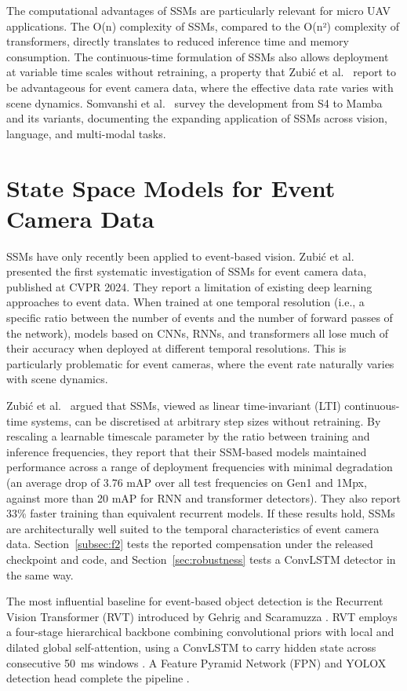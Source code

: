 \documentclass[11pt, a4paper]{report}
\begin{document}
The computational advantages of SSMs are particularly relevant for micro UAV applications. The O(n) complexity of SSMs, compared to the O(n²) complexity of transformers, directly translates to reduced inference time and memory consumption. The continuous-time formulation of SSMs also allows deployment at variable time scales without retraining, a property that Zubi\'{c} et al.~\cite{zubic2024state} report to be advantageous for event camera data, where the effective data rate varies with scene dynamics. Somvanshi et al.~\cite{somvanshi2025from} survey the development from S4 to Mamba and its variants, documenting the expanding application of SSMs across vision, language, and multi-modal tasks.

\section{State Space Models for Event Camera Data}
SSMs have only recently been applied to event-based vision. Zubi\'{c} et al.~\cite{zubic2024state} presented the first systematic investigation of SSMs for event camera data, published at CVPR 2024. They report a limitation of existing deep learning approaches to event data. When trained at one temporal resolution (i.e., a specific ratio between the number of events and the number of forward passes of the network), models based on CNNs, RNNs, and transformers all lose much of their accuracy when deployed at different temporal resolutions. This is particularly problematic for event cameras, where the event rate naturally varies with scene dynamics.

Zubi\'{c} et al.~\cite{zubic2024state} argued that SSMs, viewed as linear time-invariant (LTI) continuous-time systems, can be discretised at arbitrary step sizes without retraining. By rescaling a learnable timescale parameter by the ratio between training and inference frequencies, they report that their SSM-based models maintained performance across a range of deployment frequencies with minimal degradation (an average drop of 3.76 mAP over all test frequencies on Gen1 and 1Mpx, against more than 20 mAP for RNN and transformer detectors). They also report 33\% faster training than equivalent recurrent models. If these results hold, SSMs are architecturally well suited to the temporal characteristics of event camera data. Section~\ref{subsec:f2} tests the reported compensation under the released checkpoint and code, and Section~\ref{sec:robustness} tests a ConvLSTM detector in the same way.

The most influential baseline for event-based object detection is the Recurrent Vision Transformer (RVT) introduced by Gehrig and Scaramuzza \cite{gehrig2023recurrent}. RVT employs a four-stage hierarchical backbone combining convolutional priors with local and dilated global self-attention, using a ConvLSTM to carry hidden state across consecutive 50~ms windows \cite{gehrig2023recurrent}. A Feature Pyramid Network (FPN) and YOLOX detection head complete the pipeline \cite{gehrig2023recurrent}.
\end{document}
